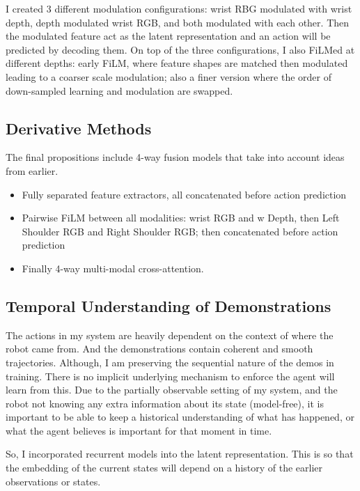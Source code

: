 I created 3 different modulation configurations: wrist RBG modulated with wrist depth, depth modulated wrist RGB, and both modulated with each other. Then the modulated feature act as the latent representation and an action will be predicted by decoding them. On top of the three configurations, I also FiLMed at different depths: early FiLM, where feature shapes are matched then modulated leading to a coarser scale modulation; also a finer version where the order of down-sampled learning and modulation are swapped.


\subsection{Derivative Methods}
The final propositions include 4-way fusion models that take into account ideas from earlier.
\begin{itemize}
  \item Fully separated feature extractors, all concatenated before action prediction 
  \item Pairwise FiLM between all modalities: wrist RGB and w Depth, then Left Shoulder RGB and Right Shoulder RGB; then concatenated before action prediction
  \item Finally 4-way multi-modal cross-attention. 
\end{itemize}

\subsection{Temporal Understanding of Demonstrations}
The actions in my system are heavily dependent on the context of where the robot came from. And the demonstrations contain coherent and smooth trajectories. Although, I am preserving the sequential nature of the demos in training. There is no implicit underlying mechanism to enforce the agent will learn from this. Due to the partially observable setting of my system, and the robot not knowing any extra information about its state (model-free), it is important to be able to keep a historical understanding of what has happened, or what the agent believes is important for that moment in time.

So, I incorporated recurrent models into the latent representation. This is so that the embedding of the current states will depend on a history of the earlier observations or states.

